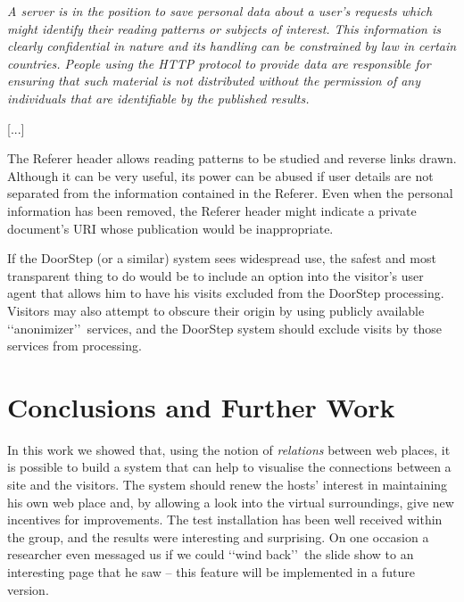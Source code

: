 \documentclass[a4paper]{danarticle}
\theoremstyle{remark}
\begin{document}
    \begin{center}
       \begin{minipage}{10cm}
       \itshape
          A server is in the position to save personal data about a user's
          requests which might identify their reading patterns or subjects of
          interest. This information is clearly confidential in nature and its
          handling can be constrained by law in certain countries. People using
          the HTTP protocol to provide data are responsible for ensuring that
          such material is not distributed without the permission of any
          individuals that are identifiable by the published results.
   
          [...]
   
          The Referer header allows reading patterns to be studied and reverse
          links drawn. Although it can be very useful, its power can be abused
          if user details are not separated from the information contained in
          the Referer. Even when the personal information has been removed, the
          Referer header might indicate a private document's URI whose
          publication would be inappropriate.
       \end{minipage}
    \end{center}
    
    If the DoorStep (or a similar) system sees widespread use, the safest and 
    most transparent thing to do would be to include an option into the
    visitor's user agent that allows him to have his visits excluded from the
    DoorStep processing. Visitors may also attempt to obscure their origin by
    using publicly available \lq\lq anonimizer\rq\rq\ services, and the DoorStep
    system should exclude visits by those services from processing.
  \section{Conclusions and Further Work} In this work we showed that, using 
    the notion of \textit{relations} between web places, it is possible to build 
    a system that can help to visualise the connections between a site and the 
    visitors. The system should renew the hosts' interest in maintaining his own 
    web place and, by allowing a look into the virtual surroundings, give new 
    incentives for improvements. The test installation has been well received 
    within the group, and the results were interesting and surprising. On one 
    occasion a researcher even messaged us if we could \lq\lq wind back\rq\rq\ 
    the slide show to an interesting page that he saw -- this feature will be 
    implemented in a future version.
    
\end{document}
